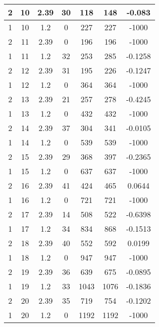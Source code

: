 \documentclass[letterpaper, 12pt]{article}
\begin{document}
\begin{longtable}{|c|c|c|c|c|c|c|}
\hline
2 & 10 & 2.39 & 30 & 118 & 148 & -0.083 \\
\hline
1 & 10 & 1.2 & 0 & 227 & 227 & -1000 \\
\hline
2 & 11 & 2.39 & 0 & 196 & 196 & -1000 \\
\hline
1 & 11 & 1.2 & 32 & 253 & 285 & -0.1258 \\
\hline
2 & 12 & 2.39 & 31 & 195 & 226 & -0.1247 \\
\hline
1 & 12 & 1.2 & 0 & 364 & 364 & -1000 \\
\hline
2 & 13 & 2.39 & 21 & 257 & 278 & -0.4245 \\
\hline
1 & 13 & 1.2 & 0 & 432 & 432 & -1000 \\
\hline
2 & 14 & 2.39 & 37 & 304 & 341 & -0.0105 \\
\hline
1 & 14 & 1.2 & 0 & 539 & 539 & -1000 \\
\hline
2 & 15 & 2.39 & 29 & 368 & 397 & -0.2365 \\
\hline
1 & 15 & 1.2 & 0 & 637 & 637 & -1000 \\
\hline
2 & 16 & 2.39 & 41 & 424 & 465 & 0.0644 \\
\hline
1 & 16 & 1.2 & 0 & 721 & 721 & -1000 \\
\hline
2 & 17 & 2.39 & 14 & 508 & 522 & -0.6398 \\
\hline
1 & 17 & 1.2 & 34 & 834 & 868 & -0.1513 \\
\hline
2 & 18 & 2.39 & 40 & 552 & 592 & 0.0199 \\
\hline
1 & 18 & 1.2 & 0 & 947 & 947 & -1000 \\
\hline
2 & 19 & 2.39 & 36 & 639 & 675 & -0.0895 \\
\hline
1 & 19 & 1.2 & 33 & 1043 & 1076 & -0.1836 \\
\hline
2 & 20 & 2.39 & 35 & 719 & 754 & -0.1202 \\
\hline
1 & 20 & 1.2 & 0 & 1192 & 1192 & -1000 \\
\hline
\end{longtable}
\end{document}
